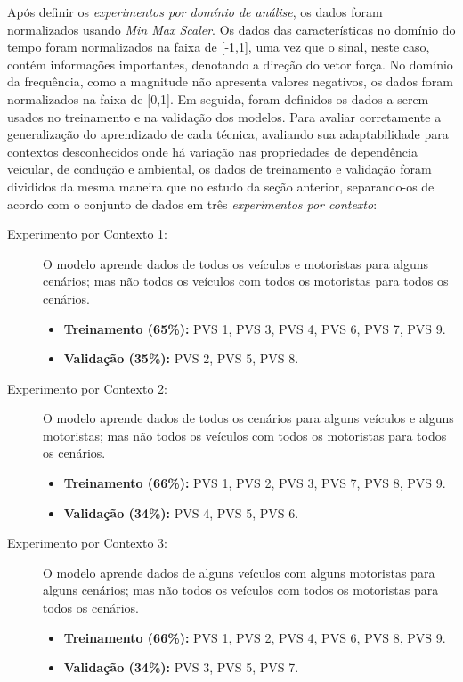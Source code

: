 Após definir os \emph{experimentos por domínio de análise}, os dados foram normalizados usando \textit{Min Max Scaler}. Os dados das características no domínio do tempo foram normalizados na faixa de [-1,1], uma vez que o sinal, neste caso, contém informações importantes, denotando a direção do vetor força. No domínio da frequência, como a magnitude não apresenta valores negativos, os dados foram normalizados na faixa de [0,1]. Em seguida, foram definidos os dados a serem usados no treinamento e na validação dos modelos. Para avaliar corretamente a generalização do aprendizado de cada técnica, avaliando sua adaptabilidade para contextos desconhecidos onde há variação nas propriedades de dependência veicular, de condução e ambiental, os dados de treinamento e validação foram divididos da mesma maneira que no estudo da seção anterior, separando-os de acordo com o conjunto de dados em três \emph{experimentos por contexto}:

\begin{description}
	
	\item[Experimento por Contexto 1:] O modelo aprende dados de todos os veículos e motoristas para alguns cenários; mas não todos os veículos com todos os motoristas para todos os cenários.
    \begin{itemize}
        \item \textbf{Treinamento (65\%):} PVS 1, PVS 3, PVS 4, PVS 6, PVS 7, PVS 9. 
        \item \textbf{Validação (35\%):} PVS 2, PVS 5, PVS 8.
    \end{itemize}
    
    \item[Experimento por Contexto 2:] O modelo aprende dados de todos os cenários para alguns veículos e alguns motoristas; mas não todos os veículos com todos os motoristas para todos os cenários.
    \begin{itemize}
        \item \textbf{Treinamento (66\%):} PVS 1, PVS 2, PVS 3, PVS 7, PVS 8, PVS 9.
        \item \textbf{Validação (34\%):} PVS 4, PVS 5, PVS 6.
    \end{itemize}
    
    \item[Experimento por Contexto 3:] O modelo aprende dados de alguns veículos com alguns motoristas para alguns cenários; mas não todos os veículos com todos os motoristas para todos os cenários.
    \begin{itemize}
        \item \textbf{Treinamento (66\%):} PVS 1, PVS 2, PVS 4, PVS 6, PVS 8, PVS 9.
        \item \textbf{Validação (34\%):} PVS 3, PVS 5, PVS 7.
    \end{itemize}
    
\end{description}

